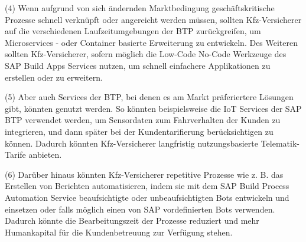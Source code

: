 (4) Wenn aufgrund von sich ändernden Marktbedingung geschäftskritische Prozesse schnell verknüpft oder angereicht werden müssen, sollten Kfz-Versicherer auf die verschiedenen Laufzeitumgebungen der BTP zurückgreifen, um Microservices - oder Container basierte Erweiterung zu entwickeln. Des Weiteren sollten Kfz-Versicherer, sofern möglich die Low-Code No-Code Werkzeuge des SAP Build Apps Services nutzen, um schnell einfachere Applikationen zu erstellen oder zu erweitern. 

(5) Aber auch Services der BTP, bei denen es am Markt präferiertere Lösungen gibt, könnten genutzt werden. So könnten beispielsweise die IoT Services der SAP BTP verwendet werden, um Sensordaten zum Fahrverhalten der Kunden zu integrieren, und dann später bei der Kundentarifierung berücksichtigen zu können. Dadurch könnten Kfz-Versicherer langfristig nutzungsbasierte Telematik-Tarife anbieten.

(6) Darüber hinaus könnten Kfz-Versicherer repetitive Prozesse wie z. B. das Erstellen von Berichten automatisieren, indem sie mit dem SAP Build Process Automation Service beaufsichtigte oder unbeaufsichtigten Bots entwickeln und einsetzen oder falls möglich einen von SAP vordefinierten Bots verwenden. Dadurch könnte die Bearbeitungszeit der Prozesse reduziert und mehr Humankapital für die Kundenbetreuung zur Verfügung stehen.


